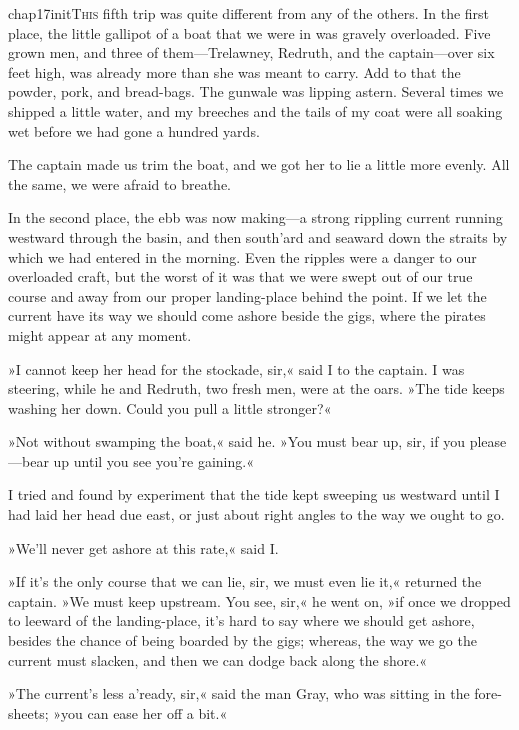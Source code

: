 
   \lettrine[lines=4,image=true]{chap17initT}{his} fifth trip was quite different from any of the others. In the first place, the little gallipot of a boat that we were in was gravely overloaded. Five grown men, and three of them—Trelawney, Redruth, and the captain—over six feet high, was already more than she was meant to carry. Add to that the powder, pork, and bread-bags. The gunwale was lipping astern. Several times we shipped a little water, and my breeches and the tails of my coat were all soaking wet before we had gone a hundred yards.

The captain made us trim the boat, and we got her to lie a little more evenly. All the same, we were afraid to breathe.

In the second place, the ebb was now making—a strong rippling current running westward through the basin, and then south'ard and seaward down the straits by which we had entered in the morning. Even the ripples were a danger to our overloaded craft, but the worst of it was that we were swept out of our true course and away from our proper landing-place behind the point. If we let the current have its way we should come ashore beside the gigs, where the pirates might appear at any moment.

»I cannot keep her head for the stockade, sir,« said I to the captain. I was steering, while he and Redruth, two fresh men, were at the oars. »The tide keeps washing her down. Could you pull a little stronger?«

»Not without swamping the boat,« said he. »You must bear up, sir, if you please—bear up until you see you're gaining.«

I tried and found by experiment that the tide kept sweeping us westward until I had laid her head due east, or just about right angles to the way we ought to go.

»We'll never get ashore at this rate,« said I.

»If it's the only course that we can lie, sir, we must even lie it,« returned the captain. »We must keep upstream. You see, sir,« he went on, »if once we dropped to leeward of the landing-place, it's hard to say where we should get ashore, besides the chance of being boarded by the gigs; whereas, the way we go the current must slacken, and then we can dodge back along the shore.«

»The current's less a'ready, sir,« said the man Gray, who was sitting in the fore-sheets; »you can ease her off a bit.«

